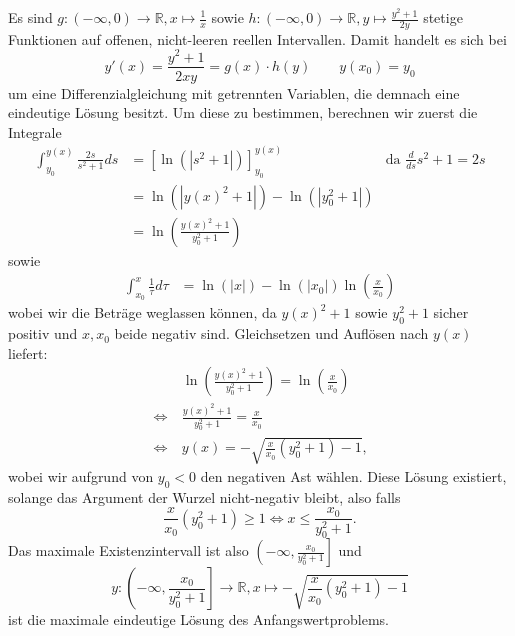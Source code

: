 \documentclass{article}
\def\iff{\ensuremath{\Leftrightarrow}} %
\def\to{\ensuremath{\rightarrow}} %
\def\R{\ensuremath{\mathbb{R}}}
\begin{document}
Es sind $g: (-\infty, 0) \to \mathds{R}, x \mapsto \frac{1}{x}$ sowie $h: (-\infty, 0) \to \mathds{R}, y \mapsto \frac{y^2+1}{2y}$ stetige Funktionen auf offenen, nicht-leeren reellen Intervallen. Damit handelt es sich bei
\begin{equation*}
	y'(x) = \frac{y^2 + 1}{2xy} = g(x) \cdot h(y) \qquad y(x_0) = y_0
\end{equation*}
um eine Differenzialgleichung mit getrennten Variablen, die demnach eine eindeutige Lösung besitzt. Um diese zu bestimmen, berechnen wir zuerst die Integrale
\begin{align*}
	\int_{y_0}^{y(x)} \frac{2s}{s^2 + 1} ds & = \left[ \ln(|s^2 + 1|) \right]_{y_0}^{y(x)}   & \text{da } \frac{d}{ds} s^2 + 1 = 2s \\
	                                        & = \ln(|y(x)^2 + 1|) - \ln(|y_0^2 + 1|)                                                \\
	                                        & = \ln\left(\frac{y(x)^2 + 1}{y_0^2 + 1}\right)
\end{align*}
sowie
\begin{align*}
	\int_{x_0}^{x} \frac{1}{\tau} d\tau & = \ln(|x|) - \ln(|x_0|) \ln\left(\frac{x}{x_0}\right)
\end{align*}
wobei wir die Beträge weglassen können, da $y(x)^2 + 1$ sowie $y_0^2 + 1$ sicher positiv und $x,x_0$ beide negativ sind. Gleichsetzen und Auflösen nach $y(x)$ liefert:
\begin{align*}
	       & \ln\left(\frac{y(x)^2 + 1}{y_0^2 + 1}\right) = \ln\left(\frac{x}{x_0}\right) \\
	\iff\  & \frac{y(x)^2 + 1}{y_0^2 + 1} = \frac{x}{x_0}                                 \\
	\iff\  & y(x) = - \sqrt{\frac{x}{x_0} (y_0^2 + 1) - 1}\text{,}
\end{align*}
wobei wir aufgrund von $y_0 < 0$ den negativen Ast wählen. Diese Lösung existiert, solange das Argument der Wurzel nicht-negativ bleibt, also falls
\begin{equation*}
	\frac{x}{x_0} (y_0^2 + 1) \geq 1 \iff x \leq \frac{x_0}{y_0^2 + 1}\text{.}
\end{equation*}
Das maximale Existenzintervall ist also $\left(-\infty, \frac{x_0}{y_0^2 + 1}\right]$ und
\begin{equation*}
	y: \left(-\infty, \frac{x_0}{y_0^2 + 1}\right] \to \R, x \mapsto  -\sqrt{\frac{x}{x_0} (y_0^2 + 1) - 1}
\end{equation*}
ist die maximale eindeutige Lösung des Anfangswertproblems.
\end{document}
